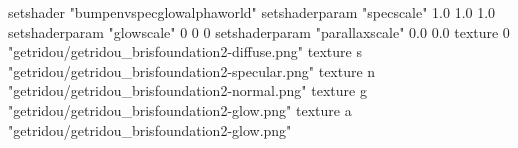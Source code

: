 setshader "bumpenvspecglowalphaworld"
setshaderparam "specscale" 1.0 1.0 1.0
setshaderparam "glowscale" 0 0 0
setshaderparam "parallaxscale" 0.0 0.0
texture 0 "getridou/getridou_brisfoundation2-diffuse.png"
texture s "getridou/getridou_brisfoundation2-specular.png"
texture n "getridou/getridou_brisfoundation2-normal.png"
texture g "getridou/getridou_brisfoundation2-glow.png"
texture a "getridou/getridou_brisfoundation2-glow.png"

